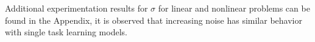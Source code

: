 %


Additional experimentation results for $\sigma$ for linear and nonlinear problems can be found in the Appendix, it is observed that increasing noise has similar behavior with single task learning models. 


